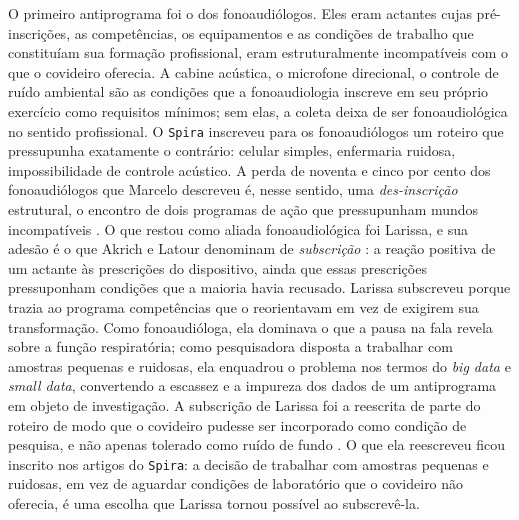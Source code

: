 O primeiro antiprograma foi o dos fonoaudiólogos. Eles eram actantes cujas pré-inscrições, as competências, os equipamentos e as condições de trabalho que constituíam sua formação profissional, eram estruturalmente incompatíveis com o que o covideiro oferecia. A cabine acústica, o microfone direcional, o controle de ruído ambiental são as condições que a fonoaudiologia inscreve em seu próprio exercício como requisitos mínimos; sem elas, a coleta deixa de ser fonoaudiológica no sentido profissional. O \texttt{Spira} inscreveu para os fonoaudiólogos um roteiro que pressupunha exatamente o contrário: celular simples, enfermaria ruidosa, impossibilidade de controle acústico. A perda de noventa e cinco por cento dos fonoaudiólogos que Marcelo descreveu é, nesse sentido, uma \textit{des-inscrição} estrutural, o encontro de dois programas de ação que pressupunham mundos incompatíveis \parencite{Akrich1992Description}. O que restou como aliada fonoaudiológica foi Larissa, e sua adesão é o que Akrich e Latour denominam de \textit{subscrição} \parencite{AkrichLatour1992Convenient}: a reação positiva de um actante às prescrições do dispositivo, ainda que essas prescrições pressuponham condições que a maioria havia recusado. Larissa subscreveu porque trazia ao programa competências que o reorientavam em vez de exigirem sua transformação. Como fonoaudióloga, ela dominava o que a pausa na fala revela sobre a função respiratória; como pesquisadora disposta a trabalhar com amostras pequenas e ruidosas, ela enquadrou o problema nos termos do \textit{big data} e \textit{small data}, convertendo a escassez e a impureza dos dados de um antiprograma em objeto de investigação. A subscrição de Larissa foi a reescrita de parte do roteiro de modo que o covideiro pudesse ser incorporado como condição de pesquisa, e não apenas tolerado como ruído de fundo \parencite{AkrichLatour1992Convenient}. O que ela reescreveu ficou inscrito nos artigos do \texttt{Spira}: a decisão de trabalhar com amostras pequenas e ruidosas, em vez de aguardar condições de laboratório que o covideiro não oferecia, é uma escolha que Larissa tornou possível ao subscrevê-la.

